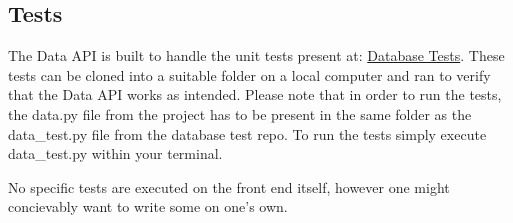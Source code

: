 \documentclass{TDP003mall}
\begin{document}
\subsection{Tests}
The Data API is built to handle the unit tests present at: \href{https://gitlab.ida.liu.se/filst04/tdp003-2018-database-tests}{Database Tests}. These
tests can be cloned into a suitable folder on a local computer and ran to
verify that the Data API works as intended. Please note that in order to run
the tests, the data.py file from the project has to be present in the
same folder as the data\_test.py file from the database test repo.
To run the tests simply execute data\_test.py within your terminal.

No specific tests are executed on the front end itself, however one might
concievably want to write some on one's own.
\end{document}
